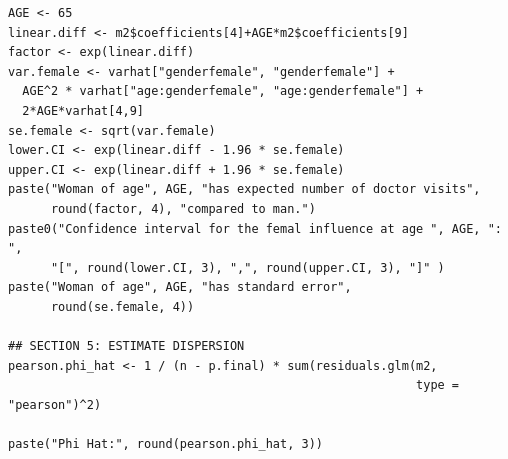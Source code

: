 \documentclass[a4paper,11pt]{article}
\begin{document}
\begin{verbatim}
AGE <- 65
linear.diff <- m2$coefficients[4]+AGE*m2$coefficients[9]
factor <- exp(linear.diff)
var.female <- varhat["genderfemale", "genderfemale"] +
  AGE^2 * varhat["age:genderfemale", "age:genderfemale"] +
  2*AGE*varhat[4,9]
se.female <- sqrt(var.female)
lower.CI <- exp(linear.diff - 1.96 * se.female)
upper.CI <- exp(linear.diff + 1.96 * se.female)
paste("Woman of age", AGE, "has expected number of doctor visits",
      round(factor, 4), "compared to man.")
paste0("Confidence interval for the femal influence at age ", AGE, ": ",
      "[", round(lower.CI, 3), ",", round(upper.CI, 3), "]" )
paste("Woman of age", AGE, "has standard error",
      round(se.female, 4))

## SECTION 5: ESTIMATE DISPERSION
pearson.phi_hat <- 1 / (n - p.final) * sum(residuals.glm(m2,
                                                         type = "pearson")^2)

paste("Phi Hat:", round(pearson.phi_hat, 3))
\end{verbatim}
\end{document}
